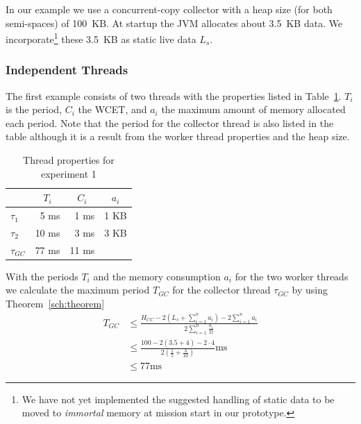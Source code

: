 In our example we use a concurrent-copy collector with a heap size
(for both semi-spaces) of 100~KB. At startup the JVM allocates about
3.5~KB data. We incorporate\footnote{We have not yet implemented the
suggested handling of static data to be moved to \emph{immortal}
memory at mission start in our prototype.} these 3.5~KB as static
live data $L_s$.



\subsubsection{Independent Threads}

The first example consists of two threads with the properties listed
in Table~\ref{fig:ex1}. $T_i$ is the period, $C_i$ the WCET, and
$a_i$ the maximum amount of memory allocated each period. Note that
the period for the collector thread is also listed in the table
although it is a result from the worker thread properties and the
heap size.

\begin{table}[tb]
\begin{center}
\begin{tabular}{lrrr}
    \toprule
    & \multicolumn{1}{c}{$T_i$} & \multicolumn{1}{c}{$C_i$} & \multicolumn{1}{c}{$a_i$} \\
    \midrule
    $\tau_1$ & 5 ms & 1 ms & 1 KB \\
    $\tau_2$ & 10 ms & 3 ms & 3 KB \\
    $\tau_{GC}$ & 77 ms & 11 ms & \\
    \bottomrule
\end{tabular}
    \caption{Thread properties for experiment 1}
\label{fig:ex1}
\end{center}
\end{table}

With the periods $T_i$ and the memory consumption $a_i$ for the two
worker threads we calculate the maximum period $T_{GC}$ for the
collector thread $\tau_{GC}$ by using Theorem~\ref{sch:theorem}
\begin{align*}
    T_{GC} & \le \frac{H_{CC}-2\left(L_s+\sum_{i=1}^{n} a_i\right)-2\sum_{i=1}^{n} a_i}
        {2\sum_{i=1}^{n} \frac{a_i}{Ti}} \\
           & \le \frac{100-2(3.5+4)-2\cdot4}
           {2\left(\frac{1}{5}+\frac{3}{10}\right)}\mbox{ms}\\
           & \le 77\mbox{ms}
\end{align*}

